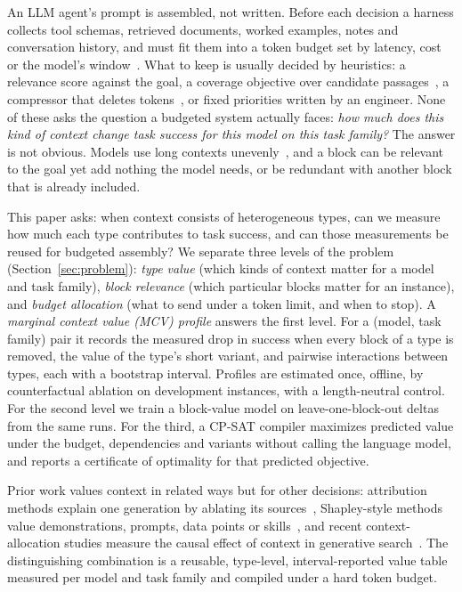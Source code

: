 An LLM agent's prompt is assembled, not written. Before each decision a harness collects tool schemas, retrieved
documents, worked examples, notes and conversation history, and must fit them into a token budget set by latency, cost or
the model's window~\cite{cesurvey2025}. What to keep is usually decided by heuristics: a relevance score against the
goal, a coverage objective over candidate passages~\cite{pacms2026}, a compressor that deletes tokens~\cite{llmlingua2_2024},
or fixed priorities written by an engineer. None of these asks the question a budgeted system actually faces:
\emph{how much does this kind of context change task success for this model on this task family?} The answer is not
obvious. Models use long contexts unevenly~\cite{lostmiddle2024}, and a block can be relevant to the goal yet add
nothing the model needs, or be redundant with another block that is already included.

This paper asks: when context consists of heterogeneous types, can we measure how much each type contributes to task
success, and can those measurements be reused for budgeted assembly? We separate three levels of the problem
(Section~\ref{sec:problem}): \emph{type value} (which kinds of context matter for a model and task family),
\emph{block relevance} (which particular blocks matter for an instance), and \emph{budget allocation} (what to send under a
token limit, and when to stop). A \emph{marginal context value (MCV) profile} answers the first level. For a (model, task
family) pair it records the measured drop in success when every block of a type is removed, the value of the type's
short variant, and pairwise interactions between types, each with a bootstrap interval. Profiles are estimated once,
offline, by counterfactual ablation on development instances, with a length-neutral control. For the second level we
train a block-value model on leave-one-block-out deltas from the same runs. For the third, a CP-SAT compiler maximizes
predicted value under the budget, dependencies and variants without calling the language model, and reports a
certificate of optimality for that predicted objective.

Prior work values context in related ways but for other decisions: attribution methods explain one generation by
ablating its sources~\cite{contextcite2024,attribot2024}, Shapley-style methods value demonstrations, prompts, data
points or skills~\cite{demoshapley2024,promptshapley2023,datashapley2019,skillsv2026}, and recent context-allocation
studies measure the causal effect of context in generative search~\cite{ctxalloc2026}. The distinguishing combination is a reusable,
type-level, interval-reported value table measured per model and task family and compiled under a hard token budget.

